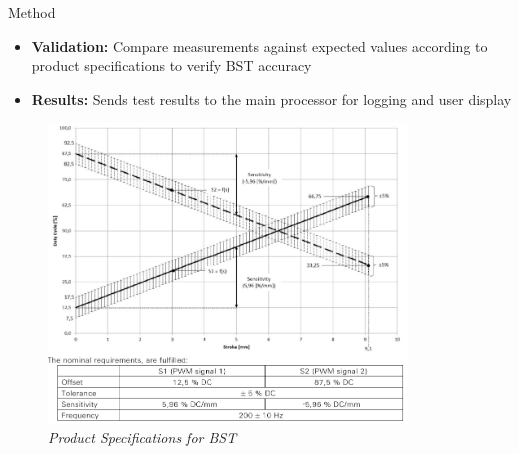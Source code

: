 \documentclass[8pt,compress,aspectratio=169]{beamer}
\newcommand\LightBold[1]{\textcolor{VSBlueLight}{\textbf{#1}}}
\begin{document}
\begin{frame}
\begin{minipage}{0.485\textwidth}
\begin{block}{Method}
{\begin{itemize}
          \item \LightBold{Validation:} Compare measurements against expected values according to product specifications to verify BST accuracy
          \item \LightBold{Results:} Sends test results to the main processor for logging and user display
        \end{itemize}
      }
    \end{block}
  \end{minipage}
  \hfill
  \begin{minipage}{0.50\textwidth}
    \begin{figure}
      \centering
      \includegraphics[width=0.85\textwidth]{assets/specs/bst_product_specs.png}
      \caption{\it Product Specifications for BST}
    \end{figure}
  \end{minipage}
\end{frame}
\end{document}
